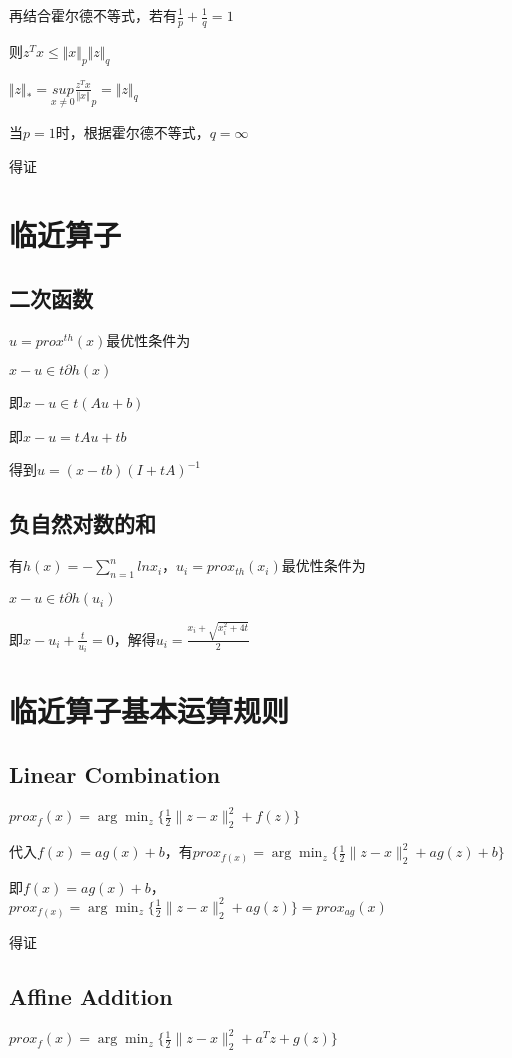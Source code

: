 \documentclass[12pt, a4paper, oneside, fontset=windows]{ctexart}
\begin{document}
再结合霍尔德不等式，若有$\frac{1}{p}+\frac{1}{q}=1$

则$z^{T}x\leq \Vert x \Vert_{p} \Vert z \Vert_{q}$

$\Vert z\Vert_{*}=\underset{x\neq 0}{sup}\frac{z^{T}x}{\Vert x\Vert}_{p}=\Vert z\Vert_{q}$

当$p=1$时，根据霍尔德不等式，$q=\infty $

得证
\section{临近算子}
\subsection{二次函数}
$u = prox^{th}(x)$最优性条件为

$x - u \in t\partial h(x)$

即$x -u \in t(Au + b)$

即$x-u = tAu + tb$

得到$u = (x-tb)(I+tA)^{-1}$
\subsection{负自然对数的和}
有$h(x) = -\sum_{n = 1}^{n} lnx_{i}$，$u_{i} = prox_{th}(x_{i})$最优性条件为

$x- u \in t\partial h(u_{i})$

即$x - u_{i}+\frac{t}{u_{i}} = 0$，解得$u_{i} = \frac{x_{i} + \sqrt{x_{i}^{2} + 4t} }{2}$
\section{临近算子基本运算规则}
\subsection{Linear Combination}
$prox_{f}(x) = \arg\min_{z}\{ \frac{1}{2} \| z- x\| ^{2}_{2} + f(z)\}$

代入$f(x) = ag(x) + b$，有$prox_{f(x)} = \arg\min_{z}\{ \frac{1}{2} \| z- x\| ^{2}_{2} + ag(z) + b\}$

即$f(x) = ag(x) + b$，$prox_{f(x)} = \arg\min_{z}\{ \frac{1}{2} \| z- x\| ^{2}_{2} + ag(z)\}=prox_{ag}(x)$

得证
\subsection{Affine Addition}
$prox_{f}(x) = \arg\min_{z}\{ \frac{1}{2} \| z - x\| ^{2}_{2} + a^{T}z +g(z) \}$
\end{document}
